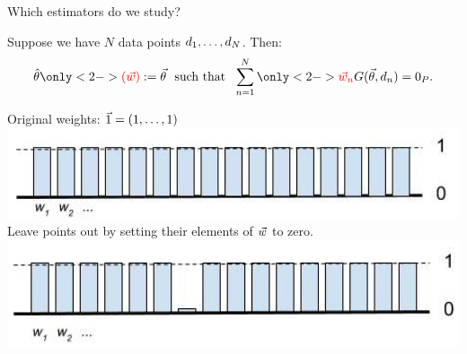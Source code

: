 
\begin{frame}[t]{Which estimators do we study?}

Suppose we have $N$ data points $d_{1}, \ldots, d_{N}$.  Then:
%
\begin{align*}
%
\thetahat \only<2->{\color{red} (\w) \color{black}} :=
\vec\theta \,\, \textrm{ such that } \,\,
\sumn
\only<2->{ \color{red} \w_{n} \color{black}}
G(\vec\theta, \d_{n}) =  \zP .
%
\end{align*}
%
\begin{minipage}{0.45\textwidth}
\begin{center}
Original weights: $\vec{1} = (1,\ldots,1)$
    \includegraphics[width=1.0\textwidth]{static_figures/orig_weights}
Leave points out by setting their elements of $\vec{w}$ to zero.
    \includegraphics[width=1.0\textwidth]{static_figures/weights_loo}
\end{center}
\end{minipage}
\begin{minipage}{0.45\textwidth}
\begin{center}
\end{center}
\end{minipage}
\end{frame}
